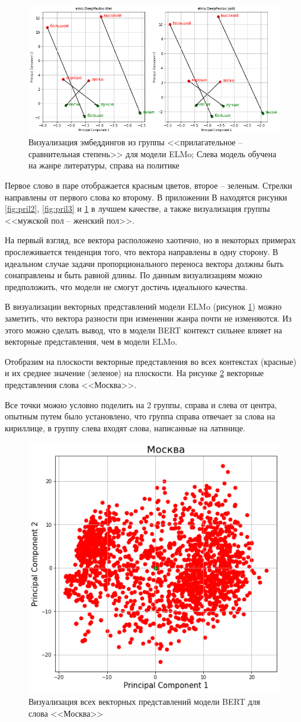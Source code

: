 \documentclass[a4paper,14pt]{article}
\begin{document}
\begin{figure}[H]
	\centering
	\includegraphics[width=0.5\linewidth]{image/elmo_pil}
	\caption{Визуализация эмбеддингов из группы <<прилагательное -- сравнительная степень>> для модели ELMo; Слева модель обучена на жанре литературы, справа на политике}
	\label{fig:elmopil}
\end{figure}

Первое слово в паре отображается красным цветов, второе -- зеленым.
Стрелки направлены от первого слова ко второму.
В приложении В находятся рисунки \ref{fig:pril2}, \ref{fig:pril3} и \ref{fig:elmopil} в лучшем качестве, а также визуализация группы <<мужской пол -- женский пол>>.
 
На первый взгляд, все вектора расположено хаотично, но в некоторых примерах прослеживается тенденция того, что вектора направлены в одну сторону.
В идеальном случае задачи пропорционального переноса вектора должны быть сонаправлены и быть равной длины.
По данным визуализациям можно предположить, что модели не смогут достичь идеального качества.

В визуализации векторных представлений модели ELMo (рисунок \ref{fig:elmopil}) можно заметить, что вектора разности при изменении жанра почти не изменяются.
Из этого можно сделать вывод, что в модели BERT контекст сильнее влияет на векторные представления, чем в модели ELMo.

Отобразим на плоскости векторные представления во всех контекстах (красные) и их среднее значение (зеленое) на плоскости.
На рисунке \ref{fig:moscow} векторные представления слова <<Москва>>.

Все точки можно условно поделить на 2 группы, справа и слева от центра, опытным путем было установлено, что группа справа отвечает за слова на кириллице, в группу слева входят слова, написанные на латинице. 

\begin{figure}[H]
	\centering
	\includegraphics[width=0.5\linewidth]{image/moscow}
	\caption{Визуализация всех векторных представлений модели BERT для слова <<Москва>>}
	\label{fig:moscow}
\end{figure}
\end{document}
